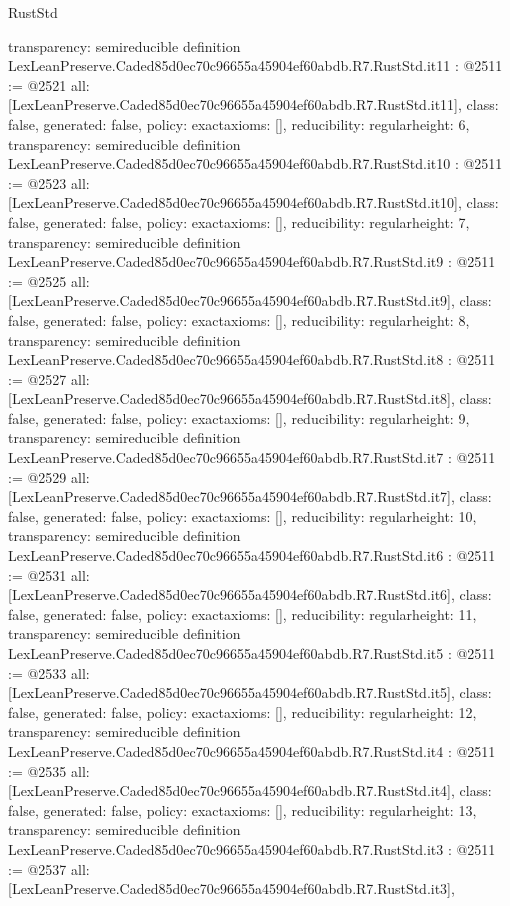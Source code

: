 \begin{lexlean}{RustStd}
\begin{coremodule}
{  transparency: semireducible
}
definition LexLeanPreserve.Caded85d0ec70c96655a45904ef60abdb.R7.RustStd.it11 : @2511 := @2521 {
  all: [LexLeanPreserve.Caded85d0ec70c96655a45904ef60abdb.R7.RustStd.it11],
  class: false,
  generated: false,
  policy: exact{axioms: []},
  reducibility: regular{height: 6},
  transparency: semireducible
}
definition LexLeanPreserve.Caded85d0ec70c96655a45904ef60abdb.R7.RustStd.it10 : @2511 := @2523 {
  all: [LexLeanPreserve.Caded85d0ec70c96655a45904ef60abdb.R7.RustStd.it10],
  class: false,
  generated: false,
  policy: exact{axioms: []},
  reducibility: regular{height: 7},
  transparency: semireducible
}
definition LexLeanPreserve.Caded85d0ec70c96655a45904ef60abdb.R7.RustStd.it9 : @2511 := @2525 {
  all: [LexLeanPreserve.Caded85d0ec70c96655a45904ef60abdb.R7.RustStd.it9],
  class: false,
  generated: false,
  policy: exact{axioms: []},
  reducibility: regular{height: 8},
  transparency: semireducible
}
definition LexLeanPreserve.Caded85d0ec70c96655a45904ef60abdb.R7.RustStd.it8 : @2511 := @2527 {
  all: [LexLeanPreserve.Caded85d0ec70c96655a45904ef60abdb.R7.RustStd.it8],
  class: false,
  generated: false,
  policy: exact{axioms: []},
  reducibility: regular{height: 9},
  transparency: semireducible
}
definition LexLeanPreserve.Caded85d0ec70c96655a45904ef60abdb.R7.RustStd.it7 : @2511 := @2529 {
  all: [LexLeanPreserve.Caded85d0ec70c96655a45904ef60abdb.R7.RustStd.it7],
  class: false,
  generated: false,
  policy: exact{axioms: []},
  reducibility: regular{height: 10},
  transparency: semireducible
}
definition LexLeanPreserve.Caded85d0ec70c96655a45904ef60abdb.R7.RustStd.it6 : @2511 := @2531 {
  all: [LexLeanPreserve.Caded85d0ec70c96655a45904ef60abdb.R7.RustStd.it6],
  class: false,
  generated: false,
  policy: exact{axioms: []},
  reducibility: regular{height: 11},
  transparency: semireducible
}
definition LexLeanPreserve.Caded85d0ec70c96655a45904ef60abdb.R7.RustStd.it5 : @2511 := @2533 {
  all: [LexLeanPreserve.Caded85d0ec70c96655a45904ef60abdb.R7.RustStd.it5],
  class: false,
  generated: false,
  policy: exact{axioms: []},
  reducibility: regular{height: 12},
  transparency: semireducible
}
definition LexLeanPreserve.Caded85d0ec70c96655a45904ef60abdb.R7.RustStd.it4 : @2511 := @2535 {
  all: [LexLeanPreserve.Caded85d0ec70c96655a45904ef60abdb.R7.RustStd.it4],
  class: false,
  generated: false,
  policy: exact{axioms: []},
  reducibility: regular{height: 13},
  transparency: semireducible
}
definition LexLeanPreserve.Caded85d0ec70c96655a45904ef60abdb.R7.RustStd.it3 : @2511 := @2537 {
  all: [LexLeanPreserve.Caded85d0ec70c96655a45904ef60abdb.R7.RustStd.it3],
}
\end{coremodule}
\end{lexlean}
